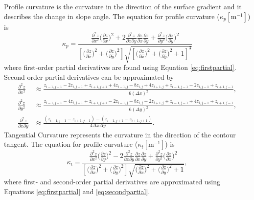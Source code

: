 \documentclass{sfuthesis}
\begin{document}
{Profile curvature is the curvature in the direction of the surface gradient and it describes the change in slope angle. The equation for profile curvature ($\kappa_p \left[\mathrm{m}^{-1}\right]$) is \citep{Neteler2008}
\begin{equation} 
\kappa_p = \frac{\frac{\partial^2 z}{\partial x^2} \big(\frac{\partial z}{\partial x}\big)^2 + 2\frac{\partial^2 z}{\partial x \partial y}\frac{\partial z}{\partial x}\frac{\partial z}{\partial y} +  \frac{\partial^2 z}{\partial y^2} \big(\frac{\partial z}{\partial y}\big)^2}{\left[\big( \frac{\partial z}{\partial x} \big) ^2 + \big(\frac{\partial z}{\partial y} \big)^2\right] \sqrt{\left[\big(\frac{\partial z}{\partial x} \big) ^2 + \big( \frac{\partial z}{\partial y}\big) ^2+1\right]^3}}
\end{equation} 
where first-order partial derivatives are found using Equation \ref{eq:firstpartial}. Second-order partial derivatives can be approximated by \citep{Hofierka2009, Neteler2008}
\begin{align}\label{eq:secondpartial}
\frac{\partial^2 z}{\partial x^2} &\approx\frac{z_{i-1,j+1}-2z_{i,j+1}+z_{i+1,j+1}+4z_{i-1,j}-8z_{i,j}+4z_{i+1,j}+z_{i-1,j-1}-2z_{i,j-1}+z_{i+1,j-1}}{6  (\Delta x)^2},\nonumber\\
\frac{\partial^2 z}{\partial y^2} &\approx \frac{z_{i-1,j+1}-4z_{i,j+1}+z_{i+1,j+1}-2z_{i-1,j}-8z_{i,j}-2z_{i+1,j}+z_{i-1,j-1}+4z_{i,j-1}+z_{i+1,j-1}}{6  (\Delta y)^2},\nonumber\\
\frac{\partial^2 z}{\partial x \partial y} &\approx \frac{(z_{i-1,j-1}-z_{i+1,j-1})-(z_{i-1,j+1}-z_{i+1,j+1})}{4  \Delta x \Delta y}.
\end{align}
Tangential Curvature represents the curvature in the direction of the contour tangent. The equation for profile curvature ($\kappa_t \left[\mathrm{m}^{-1}\right]$) is \citep{Neteler2008}
\begin{equation}
\kappa_t = \frac{\frac{\partial^2 z}{\partial x^2} \big(\frac{\partial z}{\partial y}\big)^2 - 2\frac{\partial^2 z}{\partial x \partial y}\frac{\partial z}{\partial x}\frac{\partial z}{\partial y} +  \frac{\partial^2 z}{\partial y^2} \big(\frac{\partial z}{\partial x}\big)^2}{\left[\big( \frac{\partial z}{\partial x} \big) ^2 + \big(\frac{\partial z}{\partial y} \big)^2\right] \sqrt{\big(\frac{\partial z}{\partial x} \big) ^2 + \big( \frac{\partial z}{\partial y}\big) ^2 +1}},
\end{equation} 	
where first- and second-order partial derivatives are approximated using Equations \ref{eq:firstpartial} and \ref{eq:secondpartial}. 

}
\end{document}
